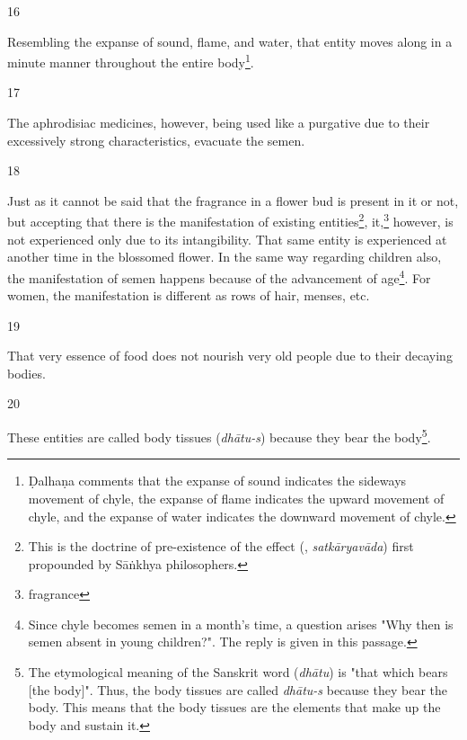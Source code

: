 \begin{translation}
\begin{sloka}


\end{sloka}

\item[16]

Resembling the expanse of sound, flame, and water, that entity moves along in a minute manner throughout the  entire body\footnote{Ḍalhaṇa comments \citep[63]{vulgate} that the expanse of sound indicates the sideways movement of chyle, the expanse of flame indicates the upward movement of chyle, and the expanse of water indicates the downward movement of chyle.}.

\item[17]

The aphrodisiac medicines, however, being used like a purgative due to their excessively strong characteristics, evacuate the semen.      

\item[18]

Just as it cannot be said that the fragrance in a flower bud is present in it or not, but 
accepting that there is the manifestation of existing entities\footnote{This is the 
doctrine of pre-existence of the effect (, \textit{satkāryavāda}) 
first propounded by Sāṅkhya philosophers.}, it,\footnote{fragrance} however, is not 
experienced only due to its intangibility. That same entity is experienced at another 
time in the blossomed flower. In the same way regarding children also, the 
manifestation of semen happens because of the advancement of 
age\footnote{Since chyle becomes semen in a month's time, a question arises "Why 
then is semen absent in young children?". The reply is given in this passage.}. For 
women, the manifestation is different as rows of hair, menses, etc. 

\item[19]

That very essence of food does not nourish very old people due to their decaying bodies.

\item[20]

These entities are called body tissues (\emph{dhātu-s}) because they bear the body\footnote{The etymological meaning of the Sanskrit word  (\emph{dhātu}) is "that which bears [the body]". Thus, the body tissues are called \emph{dhātu-s} because they bear the body. This means that the body tissues are the elements that make up the body and sustain it.}. 


\end{translation}
